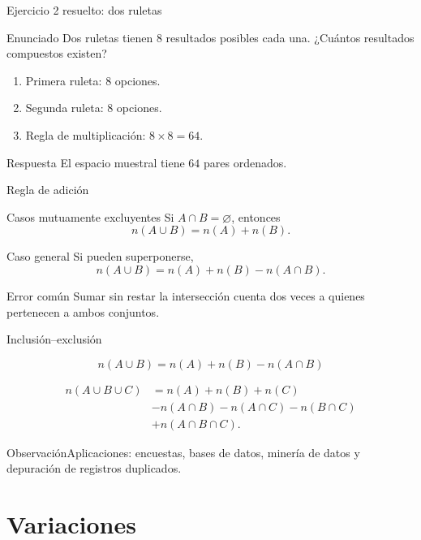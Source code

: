 \documentclass[aspectratio=169,11pt]{beamer}
\newcommand{\observacion}[1]{\begin{block}{Observación}#1\end{block}}
\begin{document}
\begin{frame}{Ejercicio 2 resuelto: dos ruletas}
\begin{block}{Enunciado}
Dos ruletas tienen 8 resultados posibles cada una. ¿Cuántos resultados compuestos existen?
\end{block}
\pause
\begin{enumerate}
  \item Primera ruleta: $8$ opciones.
  \pause
  \item Segunda ruleta: $8$ opciones.
  \pause
  \item Regla de multiplicación: $8\times8=64$.
\end{enumerate}
\begin{exampleblock}{Respuesta}
El espacio muestral tiene $64$ pares ordenados.
\end{exampleblock}
\end{frame}

\begin{frame}{Regla de adición}
\begin{block}{Casos mutuamente excluyentes}
Si $A\cap B=\varnothing$, entonces
\[
n(A\cup B)=n(A)+n(B).
\]
\end{block}
\pause
\begin{block}{Caso general}
Si pueden superponerse,
\[
n(A\cup B)=n(A)+n(B)-n(A\cap B).
\]
\end{block}
\begin{alertblock}{Error común}
Sumar sin restar la intersección cuenta dos veces a quienes pertenecen a ambos conjuntos.
\end{alertblock}
\end{frame}

\begin{frame}{Inclusión--exclusión}
\small
\begin{theorem}
\[
n(A\cup B)=n(A)+n(B)-n(A\cap B)
\]
\end{theorem}
\begin{theorem}
\[
\begin{aligned}
n(A\cup B\cup C)&=n(A)+n(B)+n(C)\\
&-n(A\cap B)-n(A\cap C)-n(B\cap C)\\
&+n(A\cap B\cap C).
\end{aligned}
\]
\end{theorem}
\observacion{Aplicaciones: encuestas, bases de datos, minería de datos y depuración de registros duplicados.}
\end{frame}

\section{Variaciones}
\end{document}
